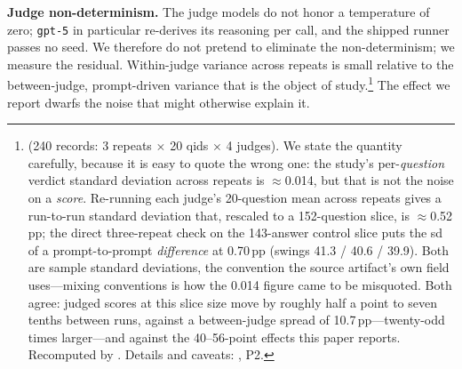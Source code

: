 \documentclass[11pt]{article}
\begin{document}
\textbf{Judge non-determinism.} The judge models do not honor a temperature of zero; \texttt{gpt-5} in particular re-derives its reasoning per call, and the shipped runner passes no seed. We therefore do not pretend to eliminate the non-determinism; we measure the residual. Within-judge variance across repeats is small relative to the between-judge, prompt-driven variance that is the object of study.\footnote{ (240 records: 3 repeats $\times$ 20 qids $\times$ 4 judges). We state the quantity carefully, because it is easy to quote the wrong one: the study's per-\emph{question} verdict standard deviation across repeats is $\approx$0.014, but that is not the noise on a \emph{score}. Re-running each judge's 20-question mean across repeats gives a run-to-run standard deviation that, rescaled to a 152-question slice, is $\approx$0.52\,pp; the direct three-repeat check on the 143-answer control slice puts the sd of a prompt-to-prompt \emph{difference} at 0.70\,pp (swings 41.3 / 40.6 / 39.9). Both are sample standard deviations, the convention the source artifact's own field uses---mixing conventions is how the 0.014 figure came to be misquoted. Both agree: judged scores at this slice size move by roughly half a point to seven tenths between runs, against a between-judge spread of 10.7\,pp---twenty-odd times larger---and against the 40--56-point effects this paper reports. Recomputed by . Details and caveats: , P2.} The effect we report dwarfs the noise that might otherwise explain it.
\end{document}
